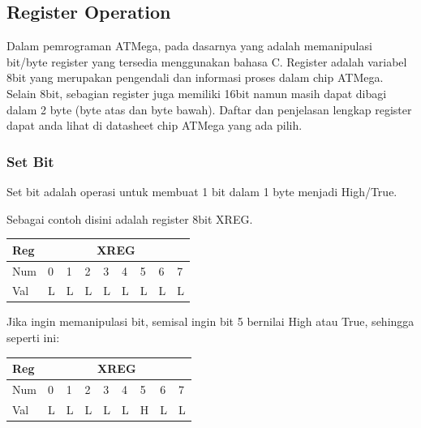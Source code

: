 \documentclass[12pt,]{article}
\begin{document}
	\newpage
	\subsection{Register Operation}
	
	Dalam pemrograman ATMega, pada dasarnya yang adalah memanipulasi bit/byte register yang tersedia menggunakan bahasa C.
	Register adalah variabel 8bit yang merupakan pengendali dan informasi proses dalam chip ATMega.
	Selain 8bit, sebagian register juga memiliki 16bit namun masih dapat dibagi dalam 2 byte (byte atas dan byte bawah).
	Daftar dan penjelasan lengkap register dapat anda lihat di datasheet chip ATMega yang ada pilih.
	
	\subsubsection{Set Bit}
	
	Set bit adalah operasi untuk membuat 1 bit dalam 1 byte menjadi High/True.
	
	Sebagai contoh disini adalah register 8bit XREG.
	
	\begin{table}[H]
		\begin{tabular}{|l|l|l|l|l|l|l|l|l|}
			\hline
			Reg & \multicolumn{8}{c|}{XREG}     \\ \hline
			Num & 0 & 1 & 2 & 3 & 4 & 5 & 6 & 7 \\ \hline
			Val & L & L & L & L & L & L & L & L \\ \hline
		\end{tabular}
	\end{table}

	
	Jika ingin memanipulasi bit, semisal ingin bit 5 bernilai High atau True, sehingga seperti ini:
	\begin{table}[H]
		\begin{tabular}{|l|l|l|l|l|l|l|l|l|}
			\hline
			Reg & \multicolumn{8}{c|}{XREG}     \\ \hline
			Num & 0 & 1 & 2 & 3 & 4 & 5 & 6 & 7 \\ \hline
			Val & L & L & L & L & L & H & L & L \\ \hline
		\end{tabular}
	\end{table}
	
\end{document}
